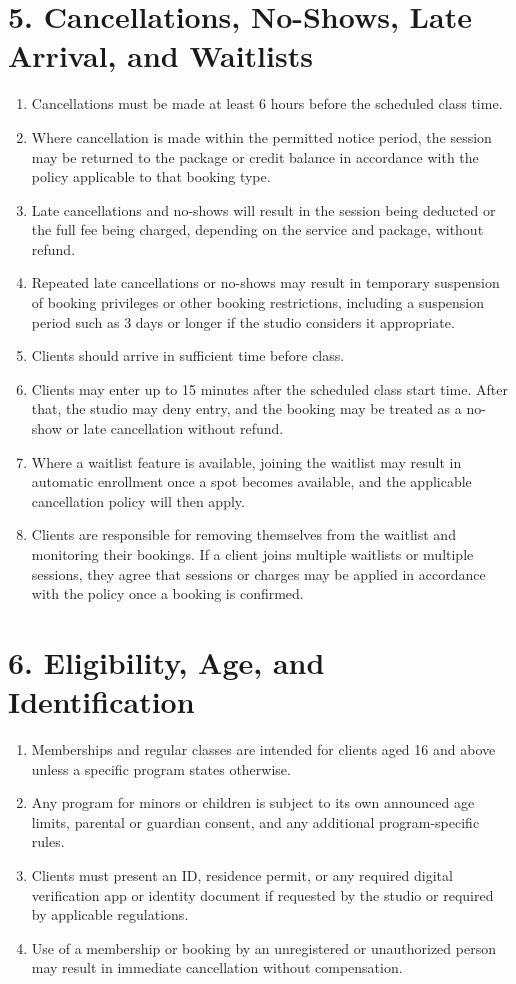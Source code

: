 \documentclass[12pt,a4paper]{article}
\begin{document}
\section*{5. Cancellations, No-Shows, Late Arrival, and Waitlists}
\begin{enumerate}
    \item Cancellations must be made at least 6 hours before the scheduled class time.
    \item Where cancellation is made within the permitted notice period, the session may be returned to the package or credit balance in accordance with the policy applicable to that booking type.
    \item Late cancellations and no-shows will result in the session being deducted or the full fee being charged, depending on the service and package, without refund.
    \item Repeated late cancellations or no-shows may result in temporary suspension of booking privileges or other booking restrictions, including a suspension period such as 3 days or longer if the studio considers it appropriate.
    \item Clients should arrive in sufficient time before class.
    \item Clients may enter up to 15 minutes after the scheduled class start time. After that, the studio may deny entry, and the booking may be treated as a no-show or late cancellation without refund.
    \item Where a waitlist feature is available, joining the waitlist may result in automatic enrollment once a spot becomes available, and the applicable cancellation policy will then apply.
    \item Clients are responsible for removing themselves from the waitlist and monitoring their bookings. If a client joins multiple waitlists or multiple sessions, they agree that sessions or charges may be applied in accordance with the policy once a booking is confirmed.
\end{enumerate}

\section*{6. Eligibility, Age, and Identification}
\begin{enumerate}
    \item Memberships and regular classes are intended for clients aged 16 and above unless a specific program states otherwise.
    \item Any program for minors or children is subject to its own announced age limits, parental or guardian consent, and any additional program-specific rules.
    \item Clients must present an ID, residence permit, or any required digital verification app or identity document if requested by the studio or required by applicable regulations.
    \item Use of a membership or booking by an unregistered or unauthorized person may result in immediate cancellation without compensation.
\end{enumerate}
\end{document}

